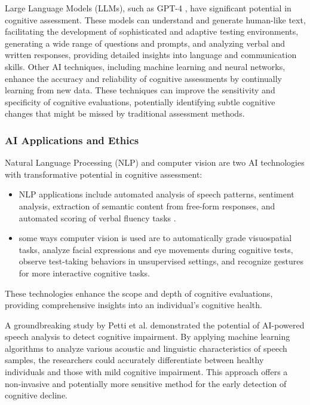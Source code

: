 Large Language Models (LLMs), such as GPT-4 \cite{Openai2023gpt4}, have significant potential in cognitive assessment. These models can understand and generate human-like text, facilitating the development of sophisticated and adaptive testing environments, generating a wide range of questions and prompts, and analyzing verbal and written responses, providing detailed insights into language and communication skills. Other AI techniques, including machine learning and neural networks, enhance the accuracy and reliability of cognitive assessments by continually learning from new data. These techniques can improve the sensitivity and specificity of cognitive evaluations, potentially identifying subtle cognitive changes that might be missed by traditional assessment methods.

\subsubsection{AI Applications and Ethics}
Natural Language Processing (NLP) and computer vision are two AI technologies with transformative potential in cognitive assessment:
\begin{itemize}
\item NLP applications include automated analysis of speech patterns, sentiment analysis, extraction of semantic content from free-form responses, and automated scoring of verbal fluency tasks \cite{Weiner2016}.
\item some ways computer vision is used are to automatically grade visuospatial tasks, analyze facial expressions and eye movements during cognitive tests, observe test-taking behaviors in unsupervised settings, and recognize gestures for more interactive cognitive tasks.
\end{itemize}
These technologies enhance the scope and depth of cognitive evaluations, providing comprehensive insights into an individual's cognitive health.

A groundbreaking study by Petti et al. \cite{Petti2020} demonstrated the potential of AI-powered speech analysis to detect cognitive impairment. By applying machine learning algorithms to analyze various acoustic and linguistic characteristics of speech samples, the researchers could accurately differentiate between healthy individuals and those with mild cognitive impairment. This approach offers a non-invasive and potentially more sensitive method for the early detection of cognitive decline.

